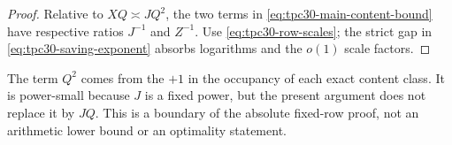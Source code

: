\begin{proof}
Relative to $XQ\asymp JQ^2$, the two terms in
\eqref{eq:tpc30-main-content-bound} have respective ratios
$J^{-1}$ and $Z^{-1}$.  Use \eqref{eq:tpc30-row-scales}; the strict
gap in \eqref{eq:tpc30-saving-exponent} absorbs logarithms and the
$o(1)$ scale factors.
\end{proof}

\begin{remark}
\label{rem:tpc30-one-point-floor}
The term $Q^2$ comes from the $+1$ in the occupancy of each exact
content class.  It is power-small because $J$ is a fixed power, but
the present argument does not replace it by $JQ$.  This is a
boundary of the absolute fixed-row proof, not an arithmetic lower
bound or an optimality statement.
\end{remark}
